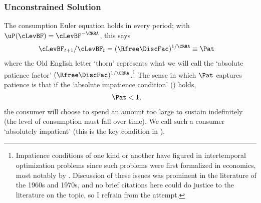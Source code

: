 \documentclass[BufferStockTheory]{subfiles}
\begin{document}
\hypertarget{Unconstrained-Solution}{}
\subsubsection{Unconstrained Solution} \label{subsec:PFUncon}

\hypertarget{APF}{}
\hypertarget{AIC}{}
The consumption Euler equation holds in every period; with $\uP(\cLevBF)=\cLevBF^{-\CRRA}$, this says\hypertarget{Pat}{}
\begin{align}
  \cLevBF_{t+1}/\cLevBF_{t}  & = (\Rfree\DiscFac)^{1/\CRRA} \equiv \Pat   \label{eq:Pat}
\end{align}
where the Old English letter `thorn' represents what we will call the
`absolute patience factor' $(\Rfree
\DiscFac)^{1/\CRRA}$.\footnote{Impatience conditions of one kind or
  another have figured in intertemporal optimization problems since
  such problems were first formalized in economics, most notably by \cite{ramseySave}.
  Discussion of these issues was prominent in the literature of the
  1960s and 1970s, and no brief citations here could do justice to the literature on the topic, so I refrain from the attempt.}  The sense in which $\Pat$ captures
patience is that if the `absolute impatience condition' (\AIC) holds,
\begin{align}
  \label{eq:AIC}
  \Pat  & < 1,
\end{align}
the consumer will choose to spend an amount too large to sustain indefinitely (the
level of consumption must fall over time).  We call such a consumer `absolutely impatient' (this is the key condition in \cite{bewleyPIH}).
\end{document}

